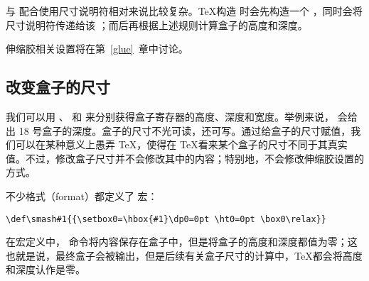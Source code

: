 \documentclass{book}
\begin{document}
与  配合使用尺寸说明符相对来说比较复杂。\TeX 构造  时会先构造一个 ，同时会将尺寸说明符传递给该 ；而后再根据上述规则计算盒子的高度和深度。

伸缩胶相关设置将在第~\ref{glue}~章中讨论。

\subsection{改变盒子的尺寸}

我们可以用 、 和  来分别获得盒子寄存器的高度、深度和宽度。举例来说， 会给出 18 号盒子的深度。盒子的尺寸不光可读，还可写。通过给盒子的尺寸赋值，我们可以在某种意义上愚弄 \TeX，使得在 \TeX 看来某个盒子的尺寸不同于其真实值。不过，修改盒子尺寸并不会修改其中的内容；特别地，不会修改伸缩胶设置的方式。

不少格式（format）都定义了  宏：
\begin{verbatim}
\def\smash#1{{\setbox0=\hbox{#1}\dp0=0pt \ht0=0pt \box0\relax}}
\end{verbatim}
在宏定义中， 命令将内容保存在盒子中，但是将盒子的高度和深度都值为零；这也就是说，最终盒子会被输出，但是后续有关盒子尺寸的计算中，\TeX 都会将高度和深度认作是零。
\end{document}
